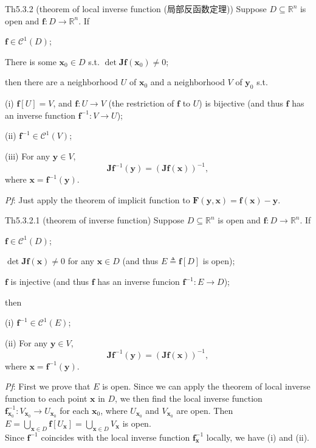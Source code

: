 \documentclass{article}
\begin{document}
\begin{Th}{Th5.3.2 (theorem of local inverse function (局部反函数定理))}
    Suppose $D\subseteq\mathbb{R}^n$ is open and $\pmb{f}:D\rightarrow\mathbb{R}^n$. If
    \begin{compactenum}
        \item $\pmb{f}\in\mathcal{C}^1(D)$;
        \item There is some $\pmb{x}_0\in D$ s.t. $\det \pmb{Jf}(\pmb{x}_0)\neq 0$;
    \end{compactenum}
    then there are a neighborhood $U$ of $\pmb{x}_0$ and a neighborhood $V$ of $\pmb{y}_0$ s.t.
    \begin{compactenum}
        \item[(i)] $\pmb{f}[U] = V$, and $\pmb{f}: U\rightarrow V$ (the restriction of $\pmb{f}$ to $U$) is bijective (and thus $\pmb{f}$ has an inverse function $\pmb{f}^{-1}: V\rightarrow U$);
        \item[(ii)] $\pmb{f}^{-1}\in\mathcal{C}^1(V)$;
        \item[(iii)] For any $\pmb{y}\in V$,
        $$ \pmb{Jf}^{-1}(\pmb{y}) = \left(\pmb{Jf}(\pmb{x})\right)^{-1}, $$
        where $\pmb{x} = \pmb{f}^{-1}(\pmb{y})$.
    \end{compactenum}
    \tcblower
    \textit{Pf}: Just apply the theorem of implicit function to $\pmb{F}(\pmb{y}, \pmb{x}) = \pmb{f}(\pmb{x})-\pmb{y}$.
\end{Th}

\begin{Th}{Th5.3.2.1 (theorem of inverse function)}
    Suppose $D\subseteq\mathbb{R}^n$ is open and $\pmb{f}:D\rightarrow\mathbb{R}^n$. If
    \begin{compactenum}
        \item $\pmb{f}\in\mathcal{C}^1(D)$;
        \item $\det \pmb{Jf}(\pmb{x})\neq 0$ for any $\pmb{x}\in D$ (and thus $E\triangleq\pmb{f}[D]$ is open);
        \item $\pmb{f}$ is injective (and thus $\pmb{f}$ has an inverse funcion $\pmb{f}^{-1}: E\rightarrow D$);
    \end{compactenum}
    then
    \begin{compactenum}
        \item[(i)] $\pmb{f}^{-1}\in\mathcal{C}^1(E)$;
        \item[(ii)] For any $\pmb{y}\in V$,
        $$ \pmb{Jf}^{-1}(\pmb{y}) = \left(\pmb{Jf}(\pmb{x})\right)^{-1}, $$
        where $\pmb{x} = \pmb{f}^{-1}(\pmb{y})$.
    \end{compactenum}
    \tcblower
    \textit{Pf}: First we prove that $E$ is open. Since we can apply the theorem of local inverse function to each point $\pmb{x}$ in $D$, we then find the local inverse function $\pmb{f}_{\pmb{x}_0}^{-1}: V_{\pmb{x}_0}\rightarrow U_{\pmb{x}_0}$ for each $\pmb{x}_0$, where $U_{\pmb{x}_0}$ and $V_{\pmb{x}_0}$ are open. Then $E = \bigcup_{\pmb{x}\in D}\pmb{f}[U_{\pmb{x}}] = \bigcup_{\pmb{x}\in D} V_{\pmb{x}}$ is open. \\
    Since $\pmb{f}^{-1}$ coincides with the local inverse function $\pmb{f}_{\pmb{x}}^{-1}$ locally, we have (i) and (ii).
\end{Th}
\end{document}
